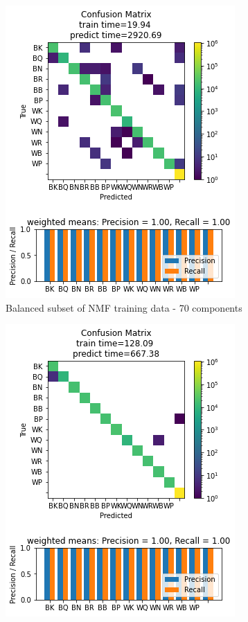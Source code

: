 \documentclass{article}
\newcommand{\NMFBL}{Balanced subset of NMF training data - 70 components}
\begin{document}
\begin{figure}[h]
\begin{subfigure}{0.33\textwidth}
\includegraphics[width=0.9\linewidth]{30NN_B_NMF70c_160x160_evaluation.png} 
\caption{\NMFBL}
\end{subfigure}
\begin{subfigure}{0.33\textwidth}
\includegraphics[width=0.9\linewidth]{30NN_PCA50c_160x160_evaluation.png}

\end{subfigure}
\end{figure}
\end{document}
